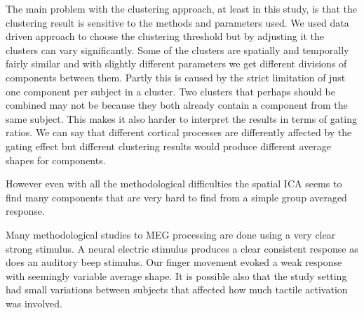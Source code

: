 \documentclass[]{article}
\begin{document}
The main problem with the clustering approach, at least in this study, is that the clustering result is sensitive to the methods and parameters used. We used data driven approach to choose the clustering threshold but by adjusting it the clusters can vary significantly. Some of the clusters are spatially and temporally fairly similar and with slightly different parameters we get different divisions of components between them. Partly this is caused by the strict limitation of just one component per subject in a cluster. Two clusters that perhaps should be combined may not be because they both already contain a component from the same subject. This makes it also harder to interpret the results in terms of gating ratios. We can say that different cortical processes are differently affected by the gating effect but different clustering results would produce different average shapes for components. 

However even with all the methodological difficulties the spatial ICA seems to find many components that are very hard to find from a simple group averaged response.

Many methodological studies to MEG processing are done using a very clear strong stimulus. A neural electric stimulus produces a clear consistent response as does an auditory beep stimulus. Our finger movement evoked a weak response with seemingly variable average shape. It is possible also that the study setting had small variations between subjects that affected how much tactile activation was involved.
\end{document}
